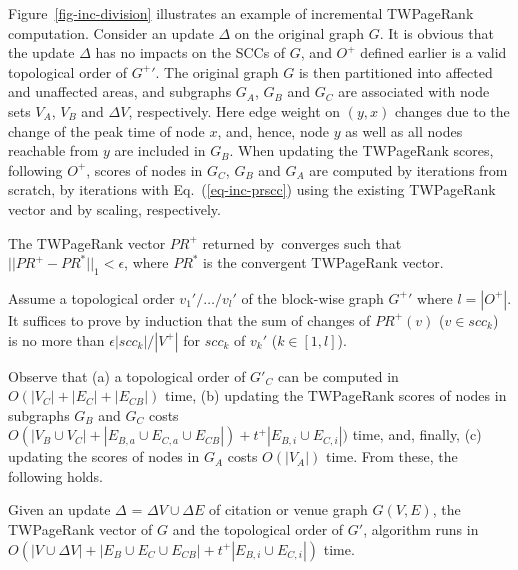\begin{example} \label{eg-layer-dag}
Figure~\ref{fig-inc-division} illustrates an example of incremental TWPageRank computation. Consider an update $\Delta$ on the original graph $G$.
%
It is obvious that the update $\Delta$ has no impacts on the SCCs of $G$, and $O^+$ defined earlier is a valid topological order of $G^+{'}$.
%
The original graph $G$ is then partitioned into affected and unaffected areas, and subgraphs $G_A$, $G_B$ and $G_C$ are associated with node sets $V_A$, $V_B$ and $\Delta V$, respectively. Here edge weight on $(y, x)$ changes due to the change of the peak time of node $x$, and, hence, node $y$ as well as all nodes reachable from $y$ are included in $G_B$.
%
When updating the TWPageRank scores, following $O^+$, scores of nodes in $G_C$, $G_B$ and $G_A$ are computed by iterations from scratch, by iterations with Eq.~(\ref{eq-inc-prscc}) using the existing TWPageRank vector and by scaling, respectively.
\end{example}

\vspace{-1ex}
\begin{theorem}
\label{lemma-subgraphA}
The TWPageRank vector $PR^+$ returned by~\inctwprscc converges such that $||PR^+-PR^{*}||_1 < \epsilon$, where $PR^{*}$ is the convergent TWPageRank vector.
\end{theorem}


\begin{proofSketch}
Assume a topological order $v_1'/\dots/v_{l}'$ of the block-wise graph $G^+{'}$ where $l=|O^+|$. It suffices to prove by induction that the sum of changes of $PR^+(v)$ ($v\in scc_k$) is no more than $\epsilon |scc_k|/|V^+|$ for $scc_k$ of $v_k'$ ($k\in [1,l]$).
\end{proofSketch}




Observe that (a) a topological order of $G'_C$ can be computed in $O(|V_C|+|E_C|+|E_{CB}|)$ time,
(b) updating the TWPageRank scores of nodes in subgraphs $G_B$ and $G_C$ costs $O(|V_B\cup V_C|+|E_{B,a}\cup E_{C,a}\cup E_{CB}|)+t^+|E_{B,i}\cup E_{C,i}|)$ time, and, finally, (c) updating the scores of nodes in $G_A$ costs $O(|V_A|)$ time. From these, the following holds.


\begin{prop} \label{lemma-inc-citation-comp}
Given an update $\Delta$ = $\Delta V\cup\Delta E$ of citation or venue graph $G(V,E)$, the TWPageRank vector of $G$ and the topological order of $G'$, algorithm \inctwprscc runs in $O(|V\cup \Delta V| + |E_B\cup E_C\cup E_{CB}| + t^+|E_{B,i}\cup E_{C,i}|)$ time.
\end{prop}



